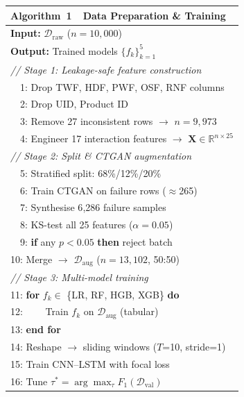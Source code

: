 \documentclass[sensors,article,submit,pdftex,moreauthors]{Definitions/mdpi}
\begin{document}
\begin{table}[H]
\centering
\begin{minipage}[t]{0.48\textwidth}
\centering
\scriptsize
\setlength{\tabcolsep}{2pt}
\begin{tabular}{l}
\toprule
\textbf{Algorithm~1}~~Data Preparation \& Training \\ \midrule
\textbf{Input:} $\mathcal{D}_\text{raw}$ ($n=10{,}000$) \\
\textbf{Output:} Trained models $\{f_k\}_{k=1}^{5}$ \\[3pt]
\textit{// Stage 1: Leakage-safe feature construction} \\
~~1: Drop TWF, HDF, PWF, OSF, RNF columns \\
~~2: Drop UID, Product ID \\
~~3: Remove 27 inconsistent rows $\to$ $n=9{,}973$ \\
~~4: Engineer 17 interaction features $\to$ $\mathbf{X} \in \mathbb{R}^{n \times 25}$ \\[3pt]
\textit{// Stage 2: Split \& CTGAN augmentation} \\
~~5: Stratified split: 68\%/12\%/20\% \\
~~6: Train CTGAN on failure rows ($\approx$265) \\
~~7: Synthesise 6{,}286 failure samples \\
~~8: KS-test all 25 features ($\alpha=0.05$) \\
~~9: \textbf{if} any $p < 0.05$ \textbf{then} reject batch \\
10: Merge $\to$ $\mathcal{D}_\text{aug}$ ($n=13{,}102$, 50:50) \\[3pt]
\textit{// Stage 3: Multi-model training} \\
11: \textbf{for} $f_k \in$ \{LR, RF, HGB, XGB\} \textbf{do} \\
12: ~~~~Train $f_k$ on $\mathcal{D}_\text{aug}$ (tabular) \\
13: \textbf{end for} \\
14: Reshape $\to$ sliding windows ($T$=10, stride=1) \\
15: Train CNN--LSTM with focal loss \\
16: Tune $\tau^*=\arg\max_\tau F_1(\mathcal{D}_\text{val})$ \\
\bottomrule
\end{tabular}
\end{minipage}\hfill
\begin{minipage}[t]{0.48\textwidth}
\centering
\scriptsize
\setlength{\tabcolsep}{2pt}
\begin{tabular}{l}

\end{tabular}
\end{minipage}
\end{table}
\end{document}
